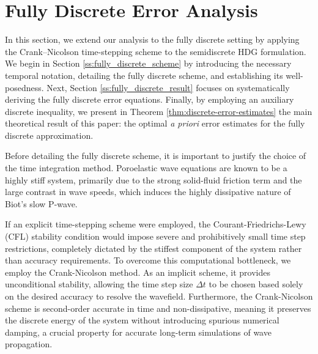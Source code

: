 \documentclass[10pt,letterpaper]{amsart}
\theoremstyle{plain} %
\theoremstyle{remark} %
\begin{document}
\section{Fully Discrete Error Analysis}
\label{sec:fully-discrete-error-analysis}


{
In this section, we extend our analysis to the fully discrete setting by applying the Crank--Nicolson time-stepping scheme to the semidiscrete HDG formulation. We begin in Section \ref{ss:fully_discrete_scheme} by introducing the necessary temporal notation, detailing the fully discrete scheme, and establishing its well-posedness. Next, Section \ref{ss:fully_discrete_result} focuses on systematically deriving the fully discrete error equations. Finally, by employing an auxiliary discrete inequality, we present in Theorem \ref{thm:discrete-error-estimates} the main theoretical result of this paper: the optimal \textit{a priori} error estimates for the fully discrete approximation.
}

{
Before detailing the fully discrete scheme, it is important to justify the choice of the time integration method. Poroelastic wave equations are known to be a highly stiff system, primarily due to the strong solid-fluid friction term and the large contrast in wave speeds, which induces the highly dissipative nature of Biot's slow P-wave. 
}

{
If an explicit time-stepping scheme were employed, the Courant-Friedrichs-Lewy (CFL) stability condition would impose severe and prohibitively small time step restrictions, completely dictated by the stiffest component of the system rather than accuracy requirements. To overcome this computational bottleneck, we employ the Crank-Nicolson method. As an implicit scheme, it provides unconditional stability, allowing the time step size $\Delta t$ to be chosen based solely on the desired accuracy to resolve the wavefield. Furthermore, the Crank-Nicolson scheme is second-order accurate in time and non-dissipative, meaning it preserves the discrete energy of the system without introducing spurious numerical damping, a crucial property for accurate long-term simulations of wave propagation.
}
\end{document}

